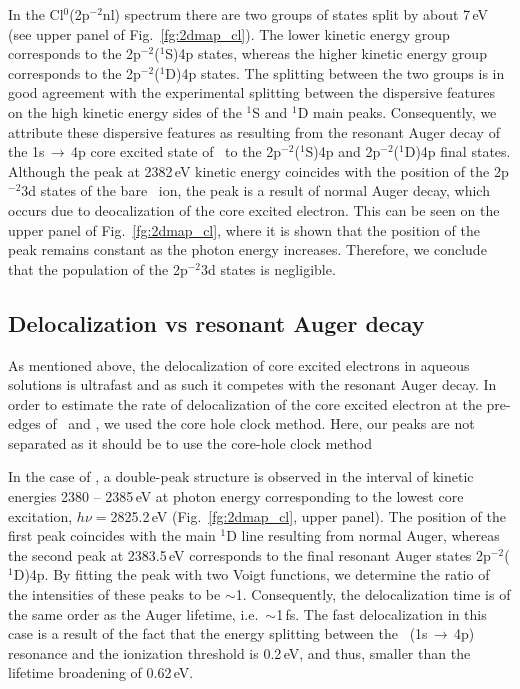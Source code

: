 In the Cl$^{0}$(2p$^{-2}$nl) spectrum there are two groups of states split by about 7\,eV (see upper panel of Fig.\ \ref{fg:2dmap_cl}). The lower kinetic energy group corresponds to the 2p$^{-2}$($^1$S)4p states, whereas the higher kinetic energy group corresponds to the 2p$^{-2}$($^1$D)4p states. The splitting between the two groups is in good agreement with the experimental splitting between the dispersive features on the high kinetic energy sides of the $^1$S and $^1$D main peaks. Consequently, we attribute these dispersive features as resulting from the resonant Auger decay of the 1s$\,\rightarrow\,$4p core excited state of \cli~to the 2p$^{-2}$($^1$S)4p and  2p$^{-2}$($^1$D)4p final states.
%
{\color{red} Although the peak at 2382\,eV kinetic energy coincides with the position of the 2p$^{-2}$3d states of the bare \cli~ion, the peak is a result of normal Auger decay, which occurs due to deocalization of the core excited electron. This can be seen on the upper panel of Fig.\ \ref{fg:2dmap_cl}, where it is shown that the position of the peak remains constant as the photon energy increases. Therefore, we conclude that the population of the 2p$^{-2}$3d states is negligible.}


\subsection{Delocalization vs resonant Auger decay}

As mentioned above, the delocalization of core excited electrons in aqueous solutions is ultrafast and as such it competes with the resonant Auger decay. In order to estimate the rate of delocalization of the core excited electron at the pre-edges of \ki~and \cli, we used the core hole clock method. {\color{red}Here, our peaks are not separated as it should be to use the core-hole clock method}


In the case of \cli, a double-peak structure is observed in the interval of kinetic energies 2380 -- 2385\,eV at photon energy corresponding to the lowest core excitation, $h\nu = $2825.2\,eV (Fig.\ \ref{fg:2dmap_cl}, upper panel). The position of the first peak coincides with the main $^1$D line resulting from normal Auger, whereas the second peak at 2383.5\,eV corresponds to the final resonant Auger states 2p$^{-2}$($^1$D)4p. By fitting the peak with two Voigt functions, we determine the ratio of the intensities of these peaks to be $\sim$1. Consequently, the delocalization time is of the same order as the Auger lifetime, i.e.\ $\sim$1\,fs. The fast delocalization in this case is a result of the fact that the energy splitting between the \cli~(1s$\,\rightarrow\,$4p) resonance and the ionization threshold is 0.2\,eV, and thus, smaller than the lifetime broadening of 0.62\,eV.


